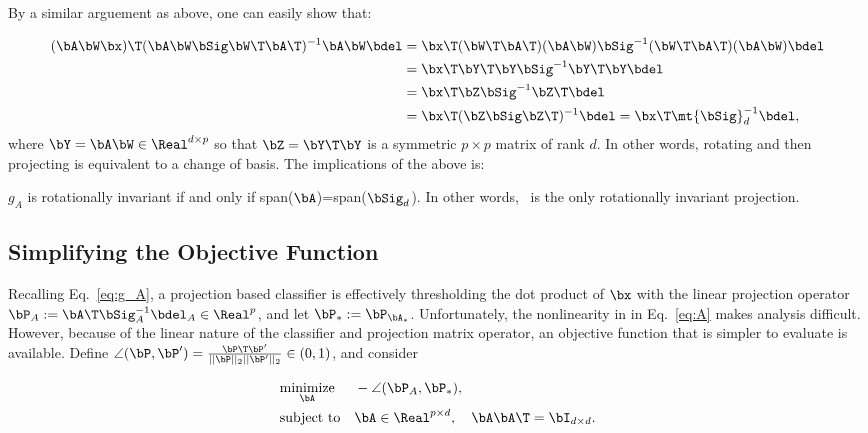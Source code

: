 \documentclass[10pt]{article}
\begin{document}
By a similar arguement as above, one can easily show that:

\begin{align*}	
(\bA  \bW \bx) \T  (\bA \bW  \bSig  \bW\T \bA\T)^{-1} \bA \bW \bdel 
&= \bx\T (\bW\T \bA\T) (\bA \bW) \bSig^{-1} (\bW\T \bA\T) (\bA \bW) \bdel \\
&= \bx\T \bY\T \bY \bSig^{-1} \bY\T \bY \bdel \\
&= \bx\T \bZ \bSig^{-1} \bZ\T \bdel \\
&= \bx\T (\bZ \bSig \bZ\T)^{-1} \bdel = \bx\T \mt{\bSig}_d^{-1} \bdel,
\end{align*}
where $\bY = \bA \bW \in \Real^{d \times p}$ so that $\bZ=\bY\T \bY$ is a symmetric ${p \times p}$ matrix of rank $d$.  In other words, rotating and then projecting is equivalent to a change of basis.
The implications of the above is: 
\begin{lem}
$g_A$ is rotationally invariant if and only if span($\bA$)=span($\bSig_d$).
In other words, \Pca~is the only rotationally invariant projection.
\end{lem}





\subsection{Simplifying the Objective Function}

Recalling Eq.~\eqref{eq:g_A}, a projection based classifier is effectively thresholding the dot product of $\bx$ with the linear projection operator $\bP_A :=\bA\T \bSig_A^{-1} \bdel_A \in \Real^p$, and let $\bP_*:=\bP_{\bA_*}$.  Unfortunately, the nonlinearity in in Eq.~\eqref{eq:A} makes analysis difficult.
However, because of the linear nature of the classifier and projection matrix operator, an objective function that is simpler to evaluate is available.
Define 
$\angle(\bP,\bP') = \frac{ \bP\T \bP'}{||\bP||_2 ||\bP'||_2} \in (0,1)$, and consider

\begin{equation} \label{eq:angle}
\begin{aligned}
& \underset{\bA}{\text{minimize}}
& & -\angle(\bP_A,\bP_*), 
\\ & \text{subject to} & & \bA \in \Real^{p \times d}, \quad \bA \bA\T = \bI_{d \times d}.
\end{aligned}
\end{equation}
\end{document}
